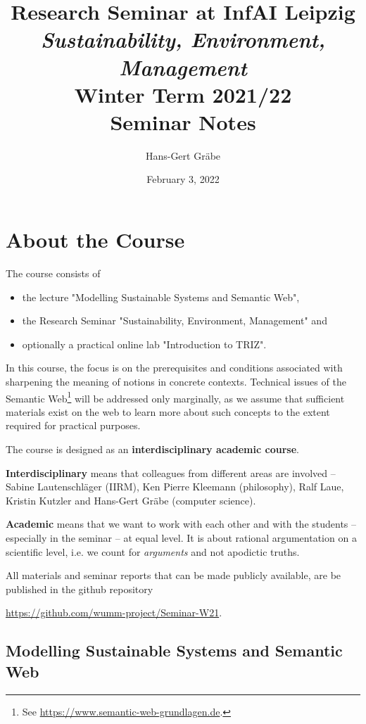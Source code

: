 \documentclass[11pt,a4paper]{article}
\title{Research Seminar at InfAI Leipzig \\[.3em] \emph{Sustainability,
    Environment, Management}\\[.3em] Winter Term 2021/22\\[.3em] Seminar
  Notes}
\author{Hans-Gert Gr\"abe}
\date{February 3, 2022}
\begin{document}
\maketitle
\tableofcontents
\newpage

\section{About the Course}

The course consists of
\begin{itemize}
\item the lecture "Modelling Sustainable Systems and Semantic Web",
\item the Research Seminar "Sustainability, Environment, Management" and
\item optionally a practical online lab "Introduction to TRIZ". 
\end{itemize}

In this course, the focus is on the prerequisites and conditions associated
with sharpening the meaning of notions in concrete contexts. Technical issues
of the Semantic Web\footnote{See
  \url{https://www.semantic-web-grundlagen.de}.} will be addressed only
marginally, as we assume that sufficient materials exist on the web to learn
more about such concepts to the extent required for practical purposes.

The course is designed as an \textbf{interdisciplinary academic course}.

\textbf{Interdisciplinary} means that colleagues from different areas are
involved – Sabine Lautenschläger (IIRM), Ken Pierre Kleemann (philosophy),
Ralf Laue, Kristin Kutzler and Hans-Gert Gräbe (computer science).

\textbf{Academic} means that we want to work with each other and with the
students – especially in the seminar – at equal level. It is about rational
argumentation on a scientific level, i.e. we count for \emph{arguments} and not
apodictic truths.

All materials and seminar reports that can be made publicly available, are be
published in the github repository
\begin{center}
  \url{https://github.com/wumm-project/Seminar-W21}.
\end{center}

\subsection{Modelling Sustainable Systems and Semantic Web}
\end{document}
